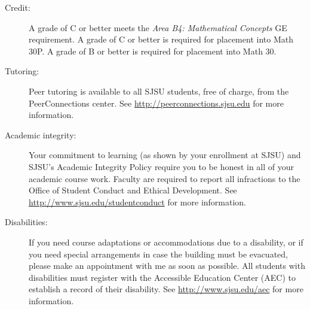 \documentclass[letterpaper,12pt,fleqn]{article}
\begin{document}
\begin{description}
\item[Credit:] A grade of C or better meets the \emph{Area B4: Mathematical
    Concepts} GE requirement. A grade of C or better is required for placement
    into Math 30P. A grade of B or better is required for placement into
    Math 30.

\item[Tutoring:] Peer tutoring is available to all SJSU students, free of
    charge, from the PeerConnections center. See
    \url{http://peerconnections.sjsu.edu} for more information.

\item[Academic integrity:] Your commitment to learning (as shown by your
    enrollment at SJSU) and SJSU's Academic Integrity Policy require you to be
    honest in all of your academic course work.  Faculty are required to report
    all infractions to the Office of Student Conduct and Ethical Development.
    See \url{http://www.sjsu.edu/studentconduct} for more information.

\item[Disabilities:] If you need course adaptations or accommodations due to a
    disability, or if you need special arrangements in case the building must
    be evacuated, please make an appointment with me as soon as possible. All
    students with disabilities must register with the Accessible Education
    Center (AEC) to establish a record of their disability. See
    \url{http://www.sjsu.edu/aec} for more information.

\end{description}
\end{document}
